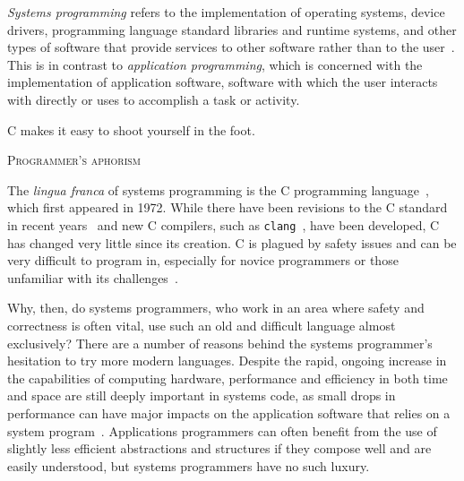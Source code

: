 \textit{Systems programming} refers to the implementation of operating systems, device drivers, programming language standard libraries and runtime systems, and other types of software that provide services to other software rather than to the user~\cite{Narten:2003:SP:1074100.1074850,Shapiro:2006:PLC:1215995.1216004}. This is in contrast to \textit{application programming}, which is concerned with the implementation of application software, software with which the user interacts with directly or uses to accomplish a task or activity.


\epigraph{ C makes it easy to shoot yourself in the foot. }%
         { \textsc{Programmer's aphorism} }


The \textit{lingua franca} of systems programming is the C programming language~\cite{kernighan1988c}, which first appeared in 1972. While there have been revisions to the C standard in recent years~\cite{C11,C99} and new C compilers, such as \texttt{clang}~\cite{lattner2008llvm}, have been developed, C has changed very little since its creation. C is plagued by safety issues and can be very difficult to program in, especially for novice programmers or those unfamiliar with its challenges~\cite{Shapiro:2006:PLC:1215995.1216004,Ray:2014:LSS:2635868.2635922,Bhattacharya:2011:APL:1985793.1985817}.

Why, then, do systems programmers, who work in an area where safety and correctness is often vital, use such an old and difficult language almost exclusively? There are a number of reasons behind the systems programmer's hesitation to try more modern languages. Despite the rapid, ongoing increase in the capabilities of computing hardware, performance and efficiency in both time and space are still deeply important in systems code, as small drops in performance can have major impacts on the application software that relies on a system program~\cite{Shapiro:2006:PLC:1215995.1216004}. Applications programmers can often benefit from the use of slightly less efficient abstractions and structures if they compose well and are easily understood, but systems programmers have no such luxury.


